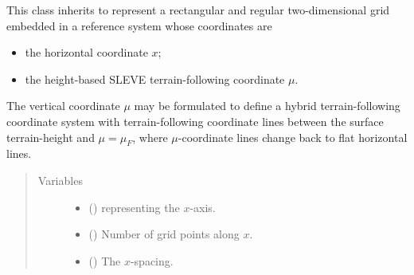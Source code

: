\documentclass[letterpaper,10pt,english]{sphinxmanual}
\begin{document}

\begin{fulllineitems}
\label{\detokenize{api:tasmania.grids.sleve.SLEVE2d}}
This class inherits {\hyperref[\detokenize{api:tasmania.grids.grid_xz.GridXZ}]{}} to represent a rectangular and regular two-dimensional
grid embedded in a reference system whose coordinates are
\begin{itemize}
\item {} 
the horizontal coordinate \(x\);

\item {} 
the height-based SLEVE terrain-following coordinate \(\mu\).

\end{itemize}

The vertical coordinate \(\mu\) may be formulated to define a hybrid terrain-following coordinate system
with terrain-following coordinate lines between the surface terrain-height and \(\mu = \mu_F\), where
\(\mu\)-coordinate lines change back to flat horizontal lines.
\begin{quote}\begin{description}
\item[{Variables}] \leavevmode\begin{itemize}
\item {} 
{\hyperref[\detokenize{api:tasmania.grids.grid_xyz.GridXYZ.x}]{}} () \textendash{} {\hyperref[\detokenize{api:tasmania.grids.axis.Axis}]{}} representing the \(x\)-axis.

\item {} 
{\hyperref[\detokenize{api:tasmania.grids.grid_xyz.GridXYZ.nx}]{}} () \textendash{} Number of grid points along \(x\).

\item {} 
{\hyperref[\detokenize{api:tasmania.grids.grid_xyz.GridXYZ.dx}]{}} () \textendash{} The \(x\)-spacing.


\end{itemize}
\end{description}
\end{quote}
\end{fulllineitems}
\end{document}
